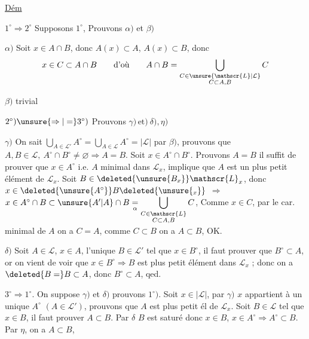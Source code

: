 \uline{Dém}

$1^\circ\Rightarrow 2^\circ$ \quad Supposons $1^\circ$, Prouvons $\alpha)$ et $\beta)$

$\alpha)$ Soit $x\in A\cap B$, donc $A(x)\subset A$, $A(x)\subset B$, donc
\[
 x\in C\subset A\cap B\qquad\text{d'où}\qquad A\cap B=
 \bigcup_{\substack{C\in\unsure{\mathscr{L}|\mathcal{L}}\\C\subset A,B}}C
\]

$\beta)$ trivial

$2^\circ)\unsure{\Rightarrow|=}3^\circ)$ \quad Prouvons $\gamma)\,\text{et})\ \delta),\eta)$

$\gamma)$ On sait $\displaystyle\bigcup_{A\in\mathscr{L}'}A^\circ=\bigcup_{A\in\mathscr{L}}A^\circ=|\mathscr{L}|$ par $\beta)$, prouvons que $A,B\in\mathscr{L},\ A^\circ\cap B^\circ\ne\varnothing\Rightarrow A=B$. Soit $x\in A^\circ\cap B^\circ$. Prouvons $A=B$ il suffit de prouver que $x\in A^\circ$  i.e. $A$ minimal dans $\mathscr{L}_x$, implique que $A$ est un plus petit élément de $\mathscr{L}_x$. Soit $B\in\deleted{\unsure{B_x}}\mathscr{L}_x$, donc $x\in\deleted{\unsure{A^\circ}}B\deleted{\unsure{{}_x}}$  $\Rightarrow$ $x\in A^\circ\cap B\subset\unsure{A'|A}\cap B\underset{\alpha}{=}\displaystyle\bigcup_{\substack{C\in\mathscr{L}\\C\subset A,B}} C$,
Comme $x\in C$, par le car. minimal de $A$ on a $C=A$, comme $C\subset B$ on a $A\subset B$, OK.

$\delta)$ Soit $A\in\mathscr{L}$, $x\in A$,    l'unique $B\in\mathscr{L}'$ tel que $x\in B^\circ$, il faut prouver que $B^\circ\subset A$, or on vient de voir que  $x\in B^\circ\Rightarrow B$ est plus petit élément dans $\mathscr{L}_x$ ; donc on a $\deleted{B=}B\subset A$, donc $B^\circ\subset A$, qed.


$3^\circ\Rightarrow1^\circ$. \quad On suppose $\gamma)$ et $\delta)$ prouvons $1^\circ)$. Soit $x\in|\mathscr{L}|$, par $\gamma)$ $x$ appartient à un unique $A^\circ$  $(A\in\mathscr{L}')$, prouvons que $A$ est plus petit él de $\mathscr{L}_x$. Soit $B\in\mathscr{L}$ tel que $x\in B$, il faut prouver $A\subset B$.  Par $\delta$ $B$ est saturé donc $x\in B$, $x\in A^\circ\Rightarrow A^\circ\subset B$.  Par $\eta$, on a $A\subset B$,
